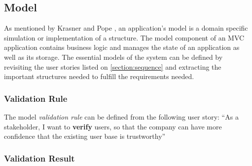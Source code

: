 \subsection{Model}
  \label{subsection:model}

As mentioned by Krasner and Pope \autocite{krasner-pope-88}, an application's model is a domain specific simulation or implementation of a structure. The model component of an MVC application contains business logic and manages the state of an application as well as its storage. 
The essential models of the system can be defined by revisiting the user stories listed on \autoref{section:sequence} and extracting the important structures needed to fulfill the requirements needed.
  
\subsubsection{Validation Rule}
The model \emph{validation rule} can be defined from the following user story:
\enquote{As a stakeholder, I want to \textbf{verify} users, so that the company can have more confidence that the existing user base is trustworthy}

\subsubsection{Validation Result}